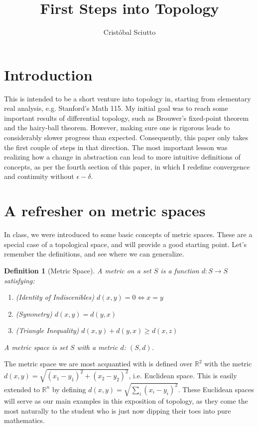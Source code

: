 \documentclass{article}
\title{First Steps into Topology}
\author{Cristóbal Sciutto}
\newtheorem*{defn}{Definition}
\begin{document}
\maketitle

\section{Introduction}
This is intended to be a short venture into topology in, starting from
elementary real analysis, e.g. Stanford's Math 115.  My initial goal was to
reach some important results of differential topology, such as Brouwer's
fixed-point theorem and the hairy-ball theorem. However, making sure one is
rigorous leads to considerably slower progress than expected. Consequently, this
paper only takes the first couple of steps in that direction. The most important
lesson was realizing how a change in abstraction can lead to more
intuitive definitions of concepts, as per the fourth section of this paper,
in which I redefine convergence and continuity without $\epsilon-\delta$.

\section{A refresher on metric spaces}
In class, we were introduced to some basic concepts of metric spaces. These are
a special case of a topological space, and will provide a good starting point.
Let's remember the definitions, and see where we can generalize.

\begin{defn}[Metric Space]
A metric on a set $S$ is a function $d:S \rightarrow S$ satisfying:
\begin{enumerate}
\item (Identity of Indiscenibles) $d(x, y) = 0 \iff x = y$
\item (Symmetry) $d(x, y) = d(y, x)$
\item (Triangle Inequality) $d(x, y) + d(y, x) \geq d(x, z)$
\end{enumerate}
A metric space is set $S$ with a metric $d$: $(S, d)$.
\end{defn}

The metric space we are most acquantied with is defined over $\mathbb{R}^2$ with the
metric $d(x,y) = \sqrt{(x_1 - y_1)^2 + (x_2 - y_2)^2}$, i.e. Euclidean space.
This is easily extended to $\mathbb{R}^n$ by defining $d(x, y) = \sqrt{\sum_i(x_i -
y_i)^2}$. These Euclidean spaces will serve as our main examples in this
exposition of topology, as they come the most naturally to the student who
is just now dipping their toes into pure mathematics.
\end{document}

